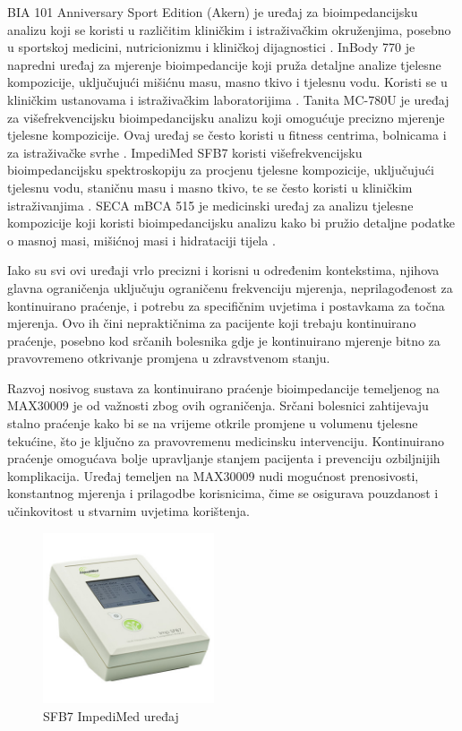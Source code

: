 \documentclass[../diplomski_rad.tex]{subfiles}
\begin{document}
BIA 101 Anniversary Sport Edition (Akern) je uređaj za bioimpedancijsku analizu koji se koristi u različitim kliničkim 
i istraživačkim okruženjima, posebno u sportskoj medicini, nutricionizmu i kliničkoj dijagnostici \cite{Wiech2022}.  
InBody 770 je napredni uređaj za mjerenje bioimpedancije koji pruža detaljne analize tjelesne kompozicije, 
uključujući mišićnu masu, masno tkivo i tjelesnu vodu.  
Koristi se u kliničkim ustanovama i istraživačkim laboratorijima \cite{Choi2022}. 
Tanita MC-780U je uređaj za višefrekvencijsku bioimpedancijsku analizu koji omogućuje precizno mjerenje tjelesne kompozicije. 
Ovaj uređaj se često koristi u fitness centrima, bolnicama i za istraživačke svrhe \cite{Slazak2024}. 
ImpediMed SFB7 koristi višefrekvencijsku bioimpedancijsku spektroskopiju za procjenu tjelesne kompozicije, 
uključujući tjelesnu vodu, staničnu masu i masno tkivo, te se često koristi u kliničkim istraživanjima \cite{Freeborn2018}. 
SECA mBCA 515 je medicinski uređaj za analizu tjelesne kompozicije koji koristi bioimpedancijsku analizu 
kako bi pružio detaljne podatke o masnoj masi, mišićnoj masi i hidrataciji tijela \cite{Lahav2021}. 

Iako su svi ovi uređaji vrlo precizni i korisni u određenim kontekstima, 
njihova glavna ograničenja uključuju ograničenu frekvenciju mjerenja, 
neprilagođenost za kontinuirano praćenje, i potrebu za specifičnim uvjetima i postavkama za točna mjerenja. 
Ovo ih čini nepraktičnima za pacijente koji trebaju kontinuirano praćenje, posebno kod srčanih bolesnika 
gdje je kontinuirano mjerenje bitno za pravovremeno otkrivanje promjena u zdravstvenom stanju.

Razvoj nosivog sustava za kontinuirano praćenje bioimpedancije 
temeljenog na MAX30009 je od važnosti zbog ovih ograničenja. 
Srčani bolesnici zahtijevaju stalno praćenje kako bi se na vrijeme otkrile promjene u volumenu tjelesne tekućine, 
što je ključno za pravovremenu medicinsku intervenciju. Kontinuirano praćenje omogućava bolje 
upravljanje stanjem pacijenta i prevenciju ozbiljnijih komplikacija. 
Uređaj temeljen na MAX30009 nudi mogućnost prenosivosti, konstantnog mjerenja i prilagodbe korisnicima, 
čime se osigurava pouzdanost i učinkovitost u stvarnim uvjetima korištenja.

\begin{figure}[htb]
    \centering
    \includegraphics[width=0.45\textwidth]{Figures/sfb7.jpg} 
    \caption{SFB7 ImpediMed uređaj \cite{sfb7}}
    \label{slk:sfb7}
\end{figure}
\end{document}

